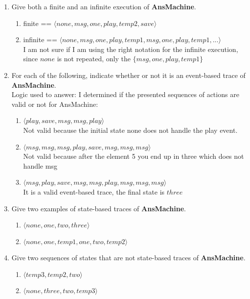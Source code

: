 \documentclass{article}
\begin{document}
\begin{enumerate}
\begin{enumerate}
 \item Give both a finite and an infinite execution of
   {\bf AnsMachine}.
   \begin{enumerate}
   \item finite == $\langle none, msg, one, play, temp2, save \rangle$
   \item infinite == $\langle none, msg, one, play, temp1, msg, one, play, temp1, ... \rangle$ \\
     I am not sure if I am using the right notation for the infinite execution, since $none$ is not repeated, only the $\{msg, one, play, temp1\}$ 
   \end{enumerate}
 \item For each of the following, indicate whether or not it is an event-based trace of
   {\bf AnsMachine}.\\
   Logic used to answer: I determined if the  presented sequences of actions are valid or not for AnsMachine:
 \begin{enumerate}
 \item  $\langle play, save, msg, msg, play \rangle$ \\
   Not valid because the initial state none does not handle the play event. \\
 \item  $\langle msg, msg, msg, play, save, msg, msg, msg \rangle$ \\
   Not valid because after the element {5} you end up in three which does not handle msg \\
 \item  $\langle msg, play, save, msg, msg, play, msg, msg, msg \rangle$ \\
   It is a valid event-based trace, the final state is $three$ \\
 \end{enumerate}
 \item Give two examples of state-based traces of
   {\bf AnsMachine}.
   \begin{enumerate}
   \item $\langle none, one, two, three \rangle$
   \item $\langle none, one, temp1, one, two, temp2 \rangle$
     \end{enumerate}
 \item Give two sequences of
   states that are not state-based traces of {\bf AnsMachine}.
   \begin{enumerate}
   \item $\langle temp3, temp2, two \rangle$
   \item $\langle none, three, two, temp3 \rangle$

\end{enumerate}
\end{enumerate}
\end{enumerate}
\end{document}
